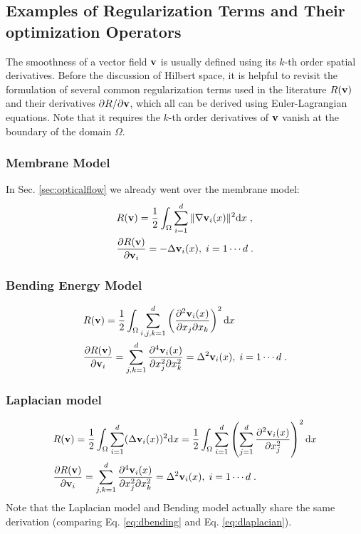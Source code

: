 \documentclass[letterpaper,12pt]{article}
\begin{document}
\subsection{Examples of Regularization Terms and Their optimization Operators}
\label{sec:regularizerexample}

The smoothness of a vector field $\mathbf{v}$ is usually defined using its $k$-th order spatial derivatives. Before the discussion of Hilbert space, it is helpful to revisit the formulation of several common regularization terms used in the literature \cite{Horn1981,Beg2005Computing,Ashburner2007,Vercauteren2009} $R(\mathbf{v})$ and their derivatives $\partial R/\partial\mathbf{v}$, which all can be derived using Euler-Lagrangian equations. Note that it requires the $k$-th order derivatives of $\mathbf{v}$ vanish at the boundary of the domain $\Omega$.

\subsubsection*{Membrane Model}
In Sec. \ref{sec:opticalflow} we already went over the membrane model:
\begin{align}
\label{eq:membraneA}
& R(\mathbf{v}) = \frac{1}{2} \int_\Omega \sum_{i=1}^d \| \nabla \mathbf{v}_i(x) \|^2 \text{d} x \;, \\
\label{eq:membraneAEL}
& \frac{\partial R(\mathbf{v})}{\partial \mathbf{v}_i} = -  \Delta \mathbf{v}_i(x)
, \; i=1 \cdots d \;. 
\end{align}

\subsubsection*{Bending Energy Model}
\begin{align}
& R(\mathbf{v}) = \frac{1}{2} \int_\Omega \sum_{i,j,k=1}^d  
\left( 
\frac{\partial^2 \mathbf{v}_i(x)}{\partial x_j \partial x_k}
\right)^2 \text{d} x 
\\
\label{eq:dbending}
& \frac{\partial R(\mathbf{v})}{\partial \mathbf{v}_i} 
= 
\sum_{j,k=1}^d
\frac{\partial^4 \mathbf{v}_i(x)}{\partial x_j^2 \partial x_k^2}
=
\Delta^2 \mathbf{v}_i(x)
, \; i=1 \cdots d \;. 
\end{align}

\subsubsection*{Laplacian model}
\begin{align}
& R(\mathbf{v}) = \frac{1}{2} \int_\Omega \sum_{i=1}^d (\Delta \mathbf{v}_i(x))^2 \text{d} x
= \frac{1}{2} \int_\Omega \sum_{i=1}^d  
\left( 
\sum_{j=1}^d  
\frac{\partial^2 \mathbf{v}_i(x)}{\partial x_j^2}
\right)^2 \text{d} x 
\\
\label{eq:dlaplacian}
& \frac{\partial R(\mathbf{v})}{\partial \mathbf{v}_i} 
= 
\sum_{j,k=1}^d
\frac{\partial^4 \mathbf{v}_i(x)}{\partial x_j^2 \partial x_k^2}
=
\Delta^2 \mathbf{v}_i(x)
, \; i=1 \cdots d \;. 
\end{align}
Note that the Laplacian model and Bending model \cite{Ashburner2007}
actually share the same derivation (comparing Eq. \ref{eq:dbending} and Eq. \ref{eq:dlaplacian}).
\end{document}

